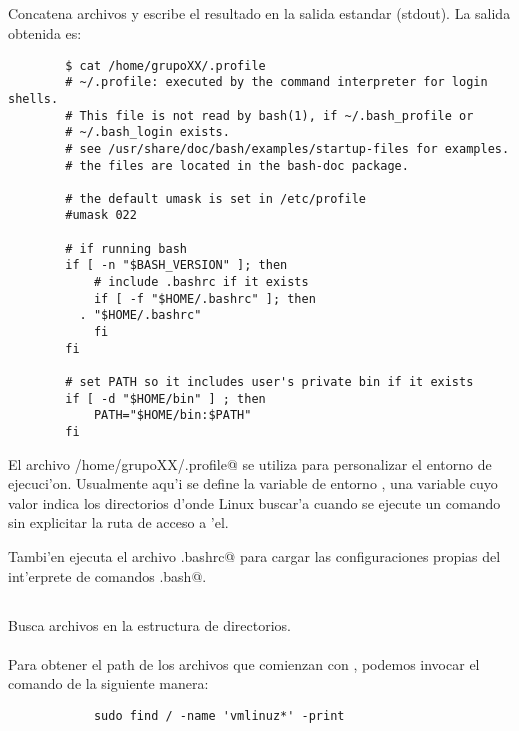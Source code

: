 		\subsection{}
      Concatena archivos y escribe el resultado en la salida estandar \mbox{(stdout)}. La salida obtenida es:\\
      \begin{mylisting}			
			\begin{verbatim}
        $ cat /home/grupoXX/.profile
        # ~/.profile: executed by the command interpreter for login shells.
        # This file is not read by bash(1), if ~/.bash_profile or 
        # ~/.bash_login exists.
        # see /usr/share/doc/bash/examples/startup-files for examples.
        # the files are located in the bash-doc package.

        # the default umask is set in /etc/profile
        #umask 022

        # if running bash
        if [ -n "$BASH_VERSION" ]; then
            # include .bashrc if it exists
            if [ -f "$HOME/.bashrc" ]; then
          . "$HOME/.bashrc"
            fi
        fi

        # set PATH so it includes user's private bin if it exists
        if [ -d "$HOME/bin" ] ; then
            PATH="$HOME/bin:$PATH"
        fi
      \end{verbatim}
      \end{mylisting}
			El archivo \verb@/home/grupoXX/.profile@ se utiliza para personalizar el entorno de ejecuci'on. Usualmente aqu'i se define la variable de entorno \verb@PATH@, una variable cuyo valor indica los directorios d'onde Linux buscar'a cuando se ejecute un comando sin explicitar la ruta de acceso a 'el.
			
			Tambi'en ejecuta el archivo \verb@.bashrc@ para cargar las configuraciones propias del int'erprete de comandos \verb@.bash@.

		\subsection{}
		  Busca archivos en la estructura de directorios.
			\\\\\indent Para obtener el path de los archivos que comienzan con \verb@vmlinuz@, podemos invocar el comando \verb@find@ de la siguiente manera:\\

      \begin{mylisting}
      \begin{verbatim} 
			sudo find / -name 'vmlinuz*' -print
      \end{verbatim}
      \end{mylisting}

